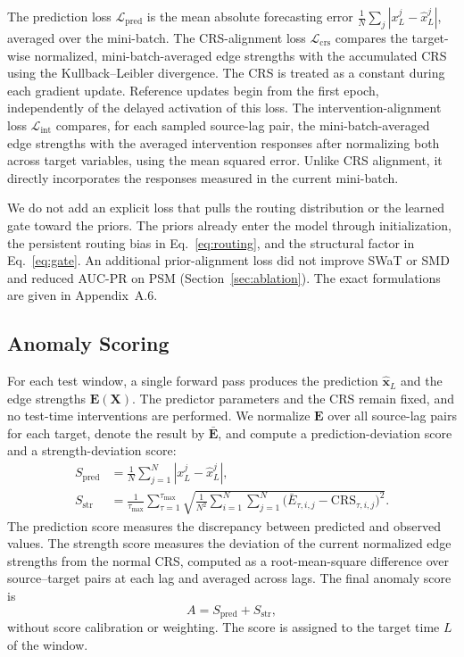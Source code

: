 \documentclass[letterpaper]{article}
\newcommand{\CRS}{\mathrm{CRS}}
\begin{document}
The prediction loss $\mathcal{L}_{\mathrm{pred}}$ is the mean absolute forecasting error $\frac{1}{N}\sum_{j}|x^j_L-\hat{x}^j_L|$, averaged over the mini-batch. The CRS-alignment loss $\mathcal{L}_{\mathrm{crs}}$ compares the target-wise normalized, mini-batch-averaged edge strengths with the accumulated CRS using the Kullback--Leibler divergence. The CRS is treated as a constant during each gradient update. Reference updates begin from the first epoch, independently of the delayed activation of this loss. The intervention-alignment loss $\mathcal{L}_{\mathrm{int}}$ compares, for each sampled source-lag pair, the mini-batch-averaged edge strengths with the averaged intervention responses after normalizing both across target variables, using the mean squared error. Unlike CRS alignment, it directly incorporates the responses measured in the current mini-batch.

We do not add an explicit loss that pulls the routing distribution or the learned gate toward the priors. The priors already enter the model through initialization, the persistent routing bias in Eq.~\eqref{eq:routing}, and the structural factor in Eq.~\eqref{eq:gate}. An additional prior-alignment loss did not improve SWaT or SMD and reduced AUC-PR on PSM (Section~\ref{sec:ablation}). The exact formulations are given in Appendix~A.6.

\subsection{Anomaly Scoring}
For each test window, a single forward pass produces the prediction $\hat{\mathbf{x}}_L$ and the edge strengths $\mathbf{E}(\mathbf{X})$. The predictor parameters and the CRS remain fixed, and no test-time interventions are performed. We normalize $\mathbf{E}$ over all source-lag pairs for each target, denote the result by $\bar{\mathbf{E}}$, and compute a prediction-deviation score and a strength-deviation score:
\begin{align}
S_{\mathrm{pred}}&=\frac{1}{N}\sum_{j=1}^{N}|x^j_L-\hat{x}^j_L|, \\
S_{\mathrm{str}}&=\frac{1}{\tau_{\max}}\sum_{\tau=1}^{\tau_{\max}}\sqrt{\frac{1}{N^2}\sum_{i=1}^{N}\sum_{j=1}^{N}\bigl(\bar{E}_{\tau,i,j}-\CRS_{\tau,i,j}\bigr)^2}.
\label{eq:scores}
\end{align}
The prediction score measures the discrepancy between predicted and observed values. The strength score measures the deviation of the current normalized edge strengths from the normal CRS, computed as a root-mean-square difference over source--target pairs at each lag and averaged across lags. The final anomaly score is
\begin{equation}
A=S_{\mathrm{pred}}+S_{\mathrm{str}},
\label{eq:final}
\end{equation}
without score calibration or weighting. The score is assigned to the target time $L$ of the window.
\end{document}
